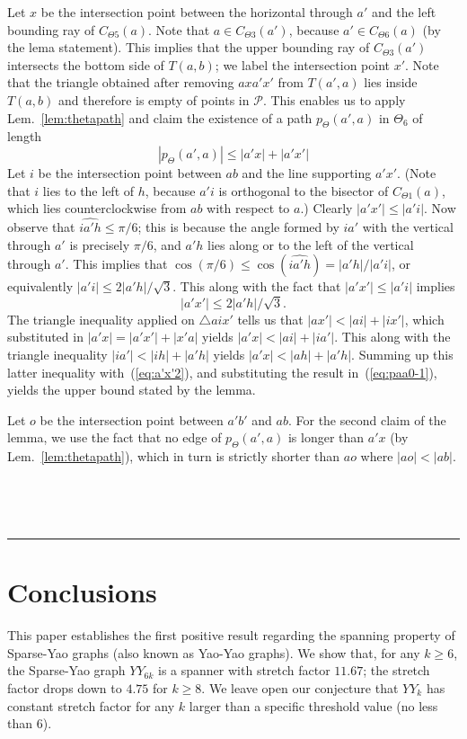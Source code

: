\documentclass[11pt]{article}
\newcommand\cone{{C}}
\newcommand\Pt{\mathcal P}
\newcommand\ang[1]{\widehat{#1}}
\newcommand{\qed}{\rule{0.5em}{1.5ex}}
\newcommand{\fqed}{{\hfill~\qed}}
\newcommand{\eproof}{{\hfill~\fqed} \vspace{1em}}
\begin{document}
Let $x$ be the intersection point between the horizontal through $a'$ and the left bounding ray of $\cone_{\Theta5}(a)$. Note that $a \in \cone_{\Theta3}(a')$, because $a' \in \cone_{\Theta6}(a)$ (by the lema statement). This implies that the upper bounding ray of $\cone_{\Theta3}(a')$ intersects the bottom side of $T(a,b)$; we label the intersection point $x'$. Note that the triangle obtained after removing $axa'x'$ from $T(a',a)$ lies inside $T(a, b)$ and therefore is empty of points in $\Pt$. This enables us to apply
Lem.~\ref{lem:thetapath} and claim the existence of a path $p_\Theta(a',a)$ in $\Theta_6$ of length
\begin{equation}
|p_\Theta(a',a)| \le |a'x| + |a'x'|
\label{eq:paa0-1}
\end{equation}
Let $i$ be the intersection point between $ab$ and the line supporting $a'x'$. (Note that $i$ lies to the left of $h$, because $a'i$ is orthogonal to the bisector of $C_{\Theta1}(a)$, which lies counterclockwise from $ab$ with respect to $a$.) Clearly $|a'x'| \le |a'i|$. Now observe that $\ang{ia'h} \le \pi/6$; this is because the angle formed by $ia'$ with the vertical through $a'$ is precisely $\pi/6$, and $a'h$ lies along or to the left of the vertical through $a'$. This implies that $\cos(\pi/6) \le \cos(\ang{ia'h}) = |a'h|/|a'i|$, or equivalently $|a'i| \le 2|a'h|/\sqrt{3}$. This along with the fact that $|a'x'| \le |a'i|$ implies
\begin{equation}
|a'x'| \le 2|a'h|/\sqrt{3}.
\label{eq:a'x'2}
\end{equation}
The triangle inequality applied on $\triangle aix'$ tells us that $|ax'| < |ai| + |ix'|$, which substituted in $|a'x| = |a'x'| + |x'a|$ yields $|a'x| < |ai| + |ia'|$. This along with the triangle inequality $|ia'| < |ih| + |a'h|$ yields $|a'x| < |ah| + |a'h|$. Summing up this latter inequality with~(\ref{eq:a'x'2}), and substituting the result in~(\ref{eq:paa0-1}), yields the upper bound stated by the lemma.

Let $o$ be the intersection point between $a'b'$ and $ab$. For the second claim of the lemma, we use the fact that no edge of $p_\Theta(a',a)$ is longer than $a'x$ (by Lem.~\ref{lem:thetapath}), which in turn is strictly shorter than $ao$ where $|ao| < |ab|$.
\eproof

\section{Conclusions}
\label{sec:conclusions}
This paper establishes the first positive result regarding the spanning property of Sparse-Yao graphs (also known as Yao-Yao graphs). We show that, for any $k \ge 6$, the Sparse-Yao graph $YY_{6k}$ is a spanner with stretch factor $11.67$; the stretch factor drops down to $4.75$ for $k \ge 8$. We leave open our conjecture that $YY_{k}$ has constant stretch factor for any $k$ larger than a specific threshold value (no less than $6$).
\end{document}
